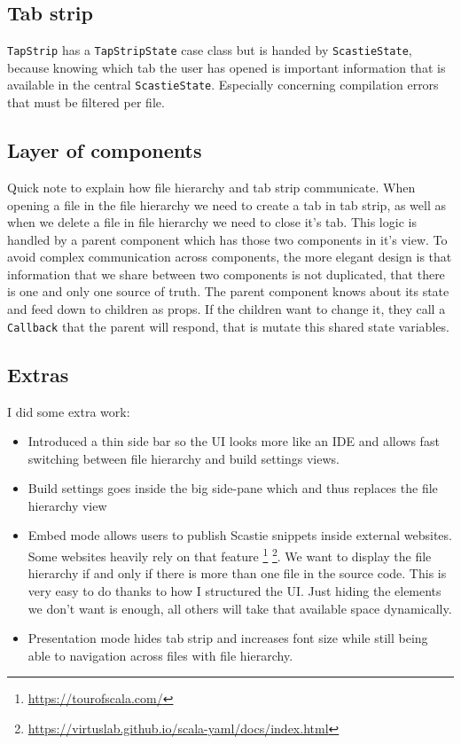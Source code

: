 \documentclass[a4paper,11pt,oneside]{report}
\begin{document}
\subsection{Tab strip}
\lstinline{TapStrip} has a \lstinline{TapStripState} case class but is handed by \lstinline{ScastieState}, because knowing which tab the user has opened is important information that is available in the central \lstinline{ScastieState}. Especially concerning compilation errors that must be filtered per file.

\subsection{Layer of components}
Quick note to explain how file hierarchy and tab strip communicate. When opening a file in the file hierarchy we need to create a tab in tab strip, as well as when we delete a file in file hierarchy we need to close it's tab. This logic is handled by a parent component which has those two components in it's view. To avoid complex communication across components, the more elegant design is that information that we share between two components is not duplicated, that there is one and only one source of truth. The parent component knows about its state and feed down to children as props. If the children want to change it, they call a \lstinline{Callback} that the parent will respond, that is mutate this shared state variables.


\subsection{Extras}
I did some extra work:
\begin{itemize}
    \item Introduced a thin side bar so the UI looks more like an IDE and allows fast switching between file hierarchy and  build settings views.
    \item Build settings goes inside the big side-pane which and thus replaces the file hierarchy view
    \item Embed mode allows users to publish Scastie snippets inside external websites. Some websites heavily rely on that feature \footnote{\url{https://tourofscala.com/}} \footnote{\url{https://virtuslab.github.io/scala-yaml/docs/index.html}}. We want to display the file hierarchy if and only if there is more than one file in the source code. This is very easy to do thanks to how I structured the UI. Just hiding the elements we don't want is enough, all others will take that available space dynamically.
    \item Presentation mode hides tab strip and increases font size while still being able to navigation across files with file hierarchy.
\end{itemize}
\end{document}
